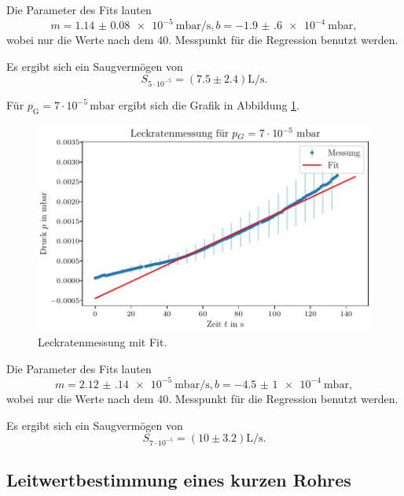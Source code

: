 Die Parameter des Fits lauten 
\begin{equation}
    m = \qty{1.14(8)e-5}{\milli\bar\per\second}, b = \qty{-1.9(6)e-4}{\milli\bar},
\end{equation}
wobei nur die Werte nach dem 40. Messpunkt
für die Regression benutzt werden.

Es ergibt sich ein Saugvermögen von
\begin{equation}
    S_{5 \cdot 10^{-5}} = (\num{7.5} \pm \num{2.4}) \si{\liter\per\second}.
\end{equation}

Für $p_\text{G} = 7 \cdot 10^{-5} \, \si{\milli\bar}$ ergibt sich die Grafik in Abbildung \ref{fig:TP_Leck_7e5}.

\begin{figure}[H]
    \centering
    \includegraphics[width=\textwidth]{plots/TP_Leck_7e5.pdf}
    \caption{Leckratenmessung mit Fit.}
    \label{fig:TP_Leck_7e5}
\end{figure}

Die Parameter des Fits lauten 
\begin{equation}
    m = \qty{2.12(14)e-5}{\milli\bar\per\second}, b = \qty{-4.5(10)e-4}{\milli\bar},
\end{equation}
wobei nur die Werte nach dem 40. Messpunkt
für die Regression benutzt werden.

Es ergibt sich ein Saugvermögen von
\begin{equation}
    S_{7 \cdot 10^{-5}} = (\num{10} \pm \num{3.2}) \si{\liter\per\second}.
\end{equation}



\subsection{Leitwertbestimmung eines kurzen Rohres}

